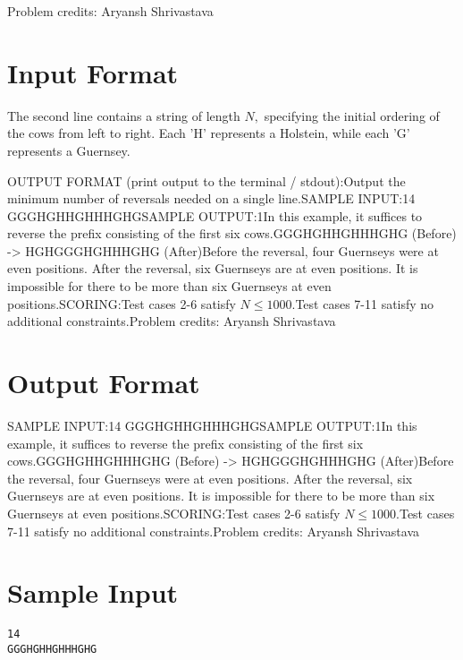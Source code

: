 \documentclass[12pt]{article}
\begin{document}
Problem credits: Aryansh Shrivastava



\section*{Input Format}
The second line contains a string of length $N,$ specifying the initial ordering
of the cows from left to right. Each 'H' represents a Holstein, while each 'G'
represents a Guernsey.

OUTPUT FORMAT (print output to the terminal / stdout):Output the minimum number of reversals needed on a single line.SAMPLE INPUT:14
GGGHGHHGHHHGHGSAMPLE OUTPUT:1In this example, it suffices to reverse the prefix consisting of the first six
cows.GGGHGHHGHHHGHG (Before)
-> HGHGGGHGHHHGHG (After)Before the reversal, four Guernseys were at even positions. After the reversal,
six Guernseys are at even positions. It is impossible for there to be more than
six Guernseys at even positions.SCORING:Test cases 2-6 satisfy $N\le 1000$.Test cases 7-11 satisfy no additional constraints.Problem credits: Aryansh Shrivastava

\section*{Output Format}
SAMPLE INPUT:14
GGGHGHHGHHHGHGSAMPLE OUTPUT:1In this example, it suffices to reverse the prefix consisting of the first six
cows.GGGHGHHGHHHGHG (Before)
-> HGHGGGHGHHHGHG (After)Before the reversal, four Guernseys were at even positions. After the reversal,
six Guernseys are at even positions. It is impossible for there to be more than
six Guernseys at even positions.SCORING:Test cases 2-6 satisfy $N\le 1000$.Test cases 7-11 satisfy no additional constraints.Problem credits: Aryansh Shrivastava

\section*{Sample Input}
\begin{verbatim}
14
GGGHGHHGHHHGHG
\end{verbatim}
\end{document}
